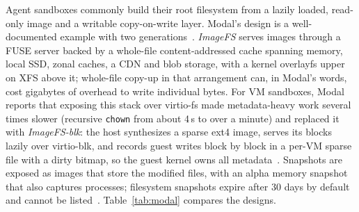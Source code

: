 Agent sandboxes commonly build their root filesystem from a lazily loaded, read-only
image and a writable copy-on-write layer. Modal's design is a well-documented example
with two generations~\cite{modalvmfs,modalimagefs,modallaunch}. \emph{ImageFS} serves
images through a FUSE server backed by a whole-file content-addressed cache spanning
memory, local SSD, zonal caches, a CDN and blob storage, with a kernel overlayfs upper on
XFS above it; whole-file copy-up in that arrangement can, in Modal's words, cost
gigabytes of overhead to write individual bytes. For VM sandboxes, Modal reports that
exposing this stack over virtio-fs made metadata-heavy work several times slower
(recursive \texttt{chown} from about 4\,s to over a minute) and replaced it with
\emph{ImageFS-blk}: the host synthesizes a sparse ext4 image, serves its blocks lazily
over virtio-blk, and records guest writes block by block in a per-VM sparse file with a
dirty bitmap, so the guest kernel owns all metadata~\cite{modalvmfs,modalvm}. Snapshots
are exposed as images that store the modified files, with an alpha memory snapshot that
also captures processes; filesystem snapshots expire after 30 days by default and cannot
be listed~\cite{modalsnap}. Table~\ref{tab:modal} compares the designs.

